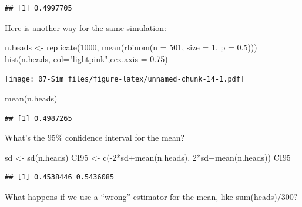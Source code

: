 \documentclass[
]{book}
\newenvironment{Shaded}{\begin{snugshade}}{\end{snugshade}}
\newcommand{\AttributeTok}[1]{\textcolor[rgb]{0.77,0.63,0.00}{#1}}
\newcommand{\DecValTok}[1]{\textcolor[rgb]{0.00,0.00,0.81}{#1}}
\newcommand{\FloatTok}[1]{\textcolor[rgb]{0.00,0.00,0.81}{#1}}
\newcommand{\FunctionTok}[1]{\textcolor[rgb]{0.00,0.00,0.00}{#1}}
\newcommand{\NormalTok}[1]{#1}
\newcommand{\OtherTok}[1]{\textcolor[rgb]{0.56,0.35,0.01}{#1}}
\newcommand{\SpecialCharTok}[1]{\textcolor[rgb]{0.00,0.00,0.00}{#1}}
\newcommand{\StringTok}[1]{\textcolor[rgb]{0.31,0.60,0.02}{#1}}
\theoremstyle{definition}
\theoremstyle{definition}
\theoremstyle{definition}
\theoremstyle{definition}
\theoremstyle{remark}
\begin{document}
\begin{verbatim}
## [1] 0.4997705
\end{verbatim}

Here is another way for the same simulation:

\begin{Shaded}
\begin{Highlighting}[]
\NormalTok{n.heads }\OtherTok{\textless{}{-}} \FunctionTok{replicate}\NormalTok{(}\DecValTok{1000}\NormalTok{, }\FunctionTok{mean}\NormalTok{(}\FunctionTok{rbinom}\NormalTok{(}\AttributeTok{n =} \DecValTok{501}\NormalTok{, }\AttributeTok{size =} \DecValTok{1}\NormalTok{, }\AttributeTok{p =} \FloatTok{0.5}\NormalTok{)))}
\FunctionTok{hist}\NormalTok{(n.heads, }\AttributeTok{col=}\StringTok{"lightpink"}\NormalTok{,}\AttributeTok{cex.axis =} \FloatTok{0.75}\NormalTok{)}
\end{Highlighting}
\end{Shaded}

\texttt{[image: 07-Sim\_files/figure-latex/unnamed-chunk-14-1.pdf]}

\begin{Shaded}
\begin{Highlighting}[]
\FunctionTok{mean}\NormalTok{(n.heads)}
\end{Highlighting}
\end{Shaded}

\begin{verbatim}
## [1] 0.4987265
\end{verbatim}

What's the 95\% confidence interval for the mean?

\begin{Shaded}
\begin{Highlighting}[]
\NormalTok{sd }\OtherTok{\textless{}{-}} \FunctionTok{sd}\NormalTok{(n.heads)}
\NormalTok{CI95 }\OtherTok{\textless{}{-}} \FunctionTok{c}\NormalTok{(}\SpecialCharTok{{-}}\DecValTok{2}\SpecialCharTok{*}\NormalTok{sd}\SpecialCharTok{+}\FunctionTok{mean}\NormalTok{(n.heads), }\DecValTok{2}\SpecialCharTok{*}\NormalTok{sd}\SpecialCharTok{+}\FunctionTok{mean}\NormalTok{(n.heads))}
\NormalTok{CI95}
\end{Highlighting}
\end{Shaded}

\begin{verbatim}
## [1] 0.4538446 0.5436085
\end{verbatim}

What happens if we use a ``wrong'' estimator for the mean, like sum(heads)/300?
\end{document}
